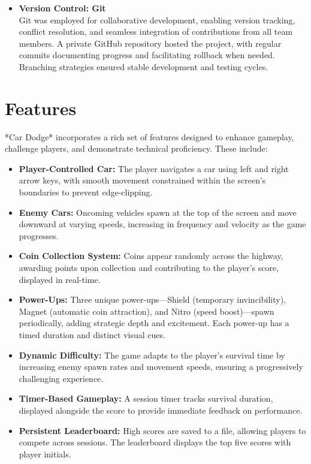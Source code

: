 \documentclass[12pt,a4paper]{article}
\begin{document}
\begin{itemize}
    \item \textbf{Version Control: Git} \\
    Git was employed for collaborative development, enabling version tracking, conflict resolution, and seamless integration of contributions from all team members. A private GitHub repository hosted the project, with regular commits documenting progress and facilitating rollback when needed. Branching strategies ensured stable development and testing cycles. \\
\end{itemize}

\section{Features}

*Car Dodge* incorporates a rich set of features designed to enhance gameplay, challenge players, and demonstrate technical proficiency. These include: \\

\begin{itemize}
    \item \textbf{Player-Controlled Car:} The player navigates a car using left and right arrow keys, with smooth movement constrained within the screen’s boundaries to prevent edge-clipping. \\
    \item \textbf{Enemy Cars:} Oncoming vehicles spawn at the top of the screen and move downward at varying speeds, increasing in frequency and velocity as the game progresses. \\
    \item \textbf{Coin Collection System:} Coins appear randomly across the highway, awarding points upon collection and contributing to the player’s score, displayed in real-time. \\
    \item \textbf{Power-Ups:} Three unique power-ups—Shield (temporary invincibility), Magnet (automatic coin attraction), and Nitro (speed boost)—spawn periodically, adding strategic depth and excitement. Each power-up has a timed duration and distinct visual cues. \\
    \item \textbf{Dynamic Difficulty:} The game adapts to the player’s survival time by increasing enemy spawn rates and movement speeds, ensuring a progressively challenging experience. \\
    \item \textbf{Timer-Based Gameplay:} A session timer tracks survival duration, displayed alongside the score to provide immediate feedback on performance. \\
    \item \textbf{Persistent Leaderboard:} High scores are saved to a file, allowing players to compete across sessions. The leaderboard displays the top five scores with player initials. \\
\end{itemize}
\end{document}
